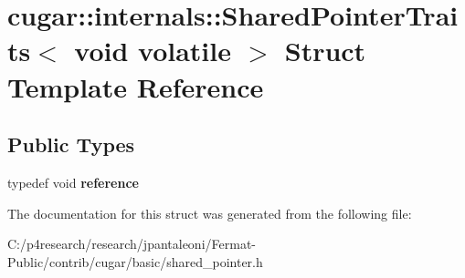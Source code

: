 \hypertarget{structcugar_1_1internals_1_1_shared_pointer_traits_3_01void_01volatile_01_4}{}\section{cugar\+:\+:internals\+:\+:Shared\+Pointer\+Traits$<$ void volatile $>$ Struct Template Reference}
\label{structcugar_1_1internals_1_1_shared_pointer_traits_3_01void_01volatile_01_4}
\subsection*{Public Types}
\begin{DoxyCompactItemize}
\item 
\mbox{\label{structcugar_1_1internals_1_1_shared_pointer_traits_3_01void_01volatile_01_4_a5c3be155ce8fc96aa7a5716700d22327}} 
typedef void {\bfseries reference}
\end{DoxyCompactItemize}


The documentation for this struct was generated from the following file\+:\begin{DoxyCompactItemize}
\item 
C\+:/p4research/research/jpantaleoni/\+Fermat-\/\+Public/contrib/cugar/basic/shared\+\_\+pointer.\+h\end{DoxyCompactItemize}
